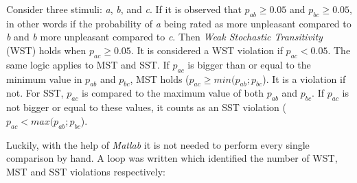 \noindent
%
Consider three stimuli: \textit{a}, \textit{b}, and \textit{c}. If it is observed that $p_{ab} \geq 0.05$ and $p_{bc} \geq 0.05$, in other words if the probability of \textit{a} being rated as more unpleasant compared to \textit{b} and \textit{b} more unpleasant compared to \textit{c}. Then \textit{Weak Stochastic Transitivity} (WST) holds when $p_{ac} \geq 0.05$. It is considered a WST violation if $p_{ac} < 0.05$. The same logic applies to MST and SST. If $p_{ac}$ is bigger than or equal to the minimum value in $p_{ab}$ and $p_{bc}$, MST holds ($p_{ac}\geq min(p_{ab};p_{bc}$). It is a violation if not. For SST, $p_{ac}$ is compared to the maximum value of both $p_{ab}$ and $p_{bc}$. If $p_{ac}$ is not bigger or equal to these values, it counts as an SST violation ($p_{ac}< max(p_{ab};p_{bc}$).

Luckily, with the help of \textit{Matlab} it is not needed to perform every single comparison by hand. A loop was written which identified the number of WST, MST and SST violations respectively:
%
\vfill
\noindent
